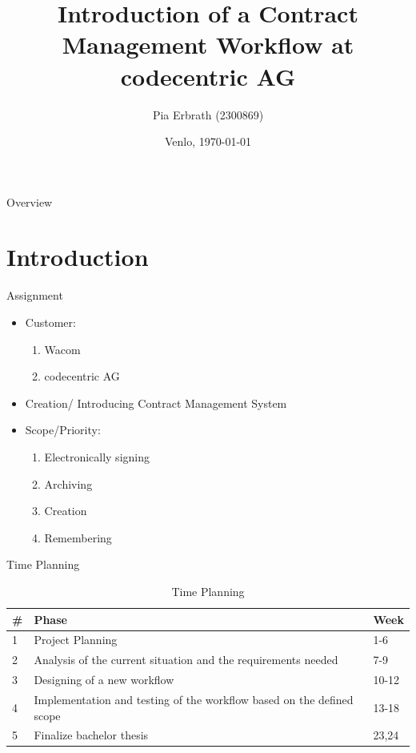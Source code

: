 \documentclass[utf8, xcolor, usenames,dvipsnames, aspectratio=169]{beamer}
\title
  [Contract Management Workflow]
  {Introduction of a Contract Management Workflow \centering at codecentric AG}
\author
  [Pia Erbrath]
  {Pia Erbrath (2300869)}
\date
  {Venlo, \today}
\institute
  {FHTenL Venlo}
\begin{document}
\maketitle

\begin{frame}{Overview}

  \tableofcontents

\end{frame}

\section{Introduction}
\begin{frame}{Assignment}
	\begin{itemize}
		\item Customer:
		\begin{enumerate}
			\item Wacom
			\item codecentric AG
		\end{enumerate}
		\item Creation/ Introducing Contract Management System
		\item Scope/Priority:
		\begin{enumerate}
			\item Electronically signing
			\item Archiving
			\item Creation
			\item Remembering
		\end{enumerate}
	\end{itemize}
\end{frame}

\begin{frame}{Time Planning}
	\begin{table}
		\begin{tabular}{|p{0.5cm}|p{9cm}|p{1.5cm}|} \hline
			\textbf{\#} & \textbf{Phase} & \textbf{Week} \\ \hline
			1 & Project Planning & 1-6\\ \hline
			\color{BlueGreen} 2 & \color{BlueGreen} Analysis of the current situation and the requirements needed & \color{BlueGreen} 7-9\\  \hline
			3 & Designing of a new workflow & 10-12 \\ \hline
			4 & Implementation and testing of the workflow based on the defined scope & 13-18 \\ \hline
			5 & Finalize bachelor thesis & 23,24 \\ \hline
		\end{tabular}
		\caption{Time Planning}
	\end{table}
\end{frame}
\end{document}
